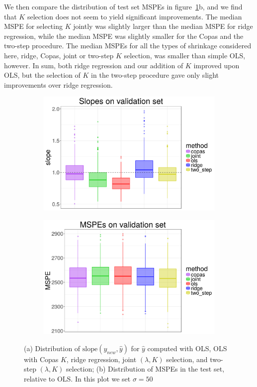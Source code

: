 \documentclass[main]{subfiles}
\begin{document}
We then compare the distribution of test set MSPEs in figure~\ref{fig:ridge_results_fixed_sigma}b, and we find that
$K$ selection does not seem to yield significant improvements. The median MSPE for selecting $K$ jointly
was slightly larger than the median MSPE for ridge regression, while the median MSPE was slightly smaller for
the Copas and the two-step procedure. The median MSPEs for all the types of shrinkage considered here,
ridge, Copas, joint or two-step $K$ selection, was smaller than simple OLS, however.
In sum, both ridge
regression and our addition of $K$ improved upon OLS, but the selection of $K$ in the two-step procedure
gave only slight improvements over ridge regression.

\begin{figure}[!h]
	\centering
	\begin{subfigure}[t]{0.45\textwidth}
		\includegraphics[width = \textwidth]{./ridge_figures/slope_distr_sigma50.png}
	\end{subfigure}
  \begin{subfigure}[t]{0.45\textwidth}
    \includegraphics[width = \textwidth]{./ridge_figures/mspe_distr_sigma50.png}
  \end{subfigure}
  \caption{(a) Distribution of $\text{slope}(y_{new}, \hat y)$ for $\hat y$ computed with OLS, OLS with Copas $K$,
	ridge regression, joint $(\lambda, K)$ selection, and two-step $(\lambda, K)$ selection;
	(b) Distribution of MSPEs in the test set, relative to OLS.
	In this plot we set $\sigma = 50$}
	\label{fig:ridge_results_fixed_sigma}
\end{figure}
\end{document}
